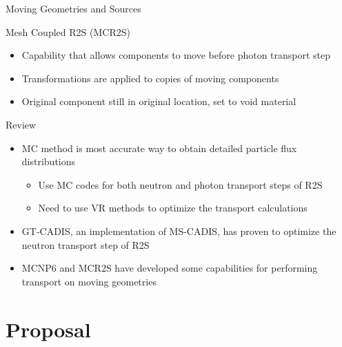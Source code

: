 \documentclass{beamer}
\begin{document}
\begin{frame}{Moving Geometries and Sources}
		\begin{block}{Mesh Coupled R2S (MCR2S)}
	\begin{itemize}
		\item{Capability that allows components to move before photon
			transport step}
		\item{Transformations are applied to copies of moving
			components}
		\item{Original component still in original location, set to void material}
	\end{itemize}
		\end{block}
\end{frame}

\begin{frame}{Review}
	\begin{itemize}
		\item{MC method is most accurate way to obtain detailed
			particle flux distributions}
			\begin{itemize}
          	  	  \item{Use MC codes for both neutron and photon transport steps
          	  	  	of R2S}
          	  	  \item{Need to use VR methods to optimize the transport
          	  	  	calculations}
          		\end{itemize}
		\item{GT-CADIS, an implementation of MS-CADIS,  has proven to optimize the neutron transport
			step of R2S}
		\item{MCNP6 and MCR2S have developed some capabilities for
			performing transport on moving geometries}
	\end{itemize}

\end{frame}



\section{Proposal}
\end{document}
